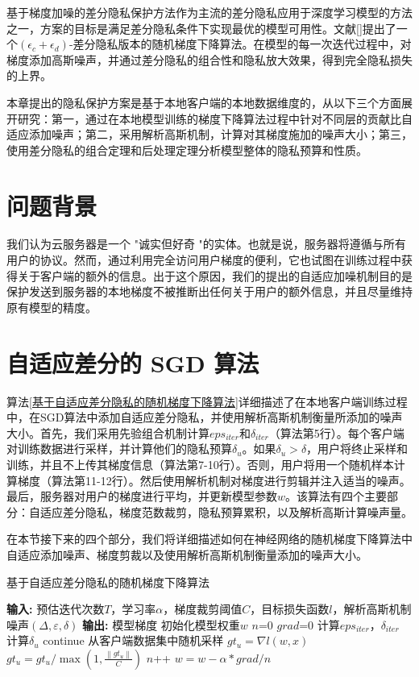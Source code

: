 基于梯度加噪的差分隐私保护方法作为主流的差分隐私应用于深度学习模型的方法之一，方案的目标是满足差分隐私条件下实现最优的模型可用性。文献[]提出了一个$\left(\epsilon_{c}+\epsilon_{d}\right)$-差分隐私版本的随机梯度下降算法。在模型的每一次迭代过程中，对梯度添加高斯噪声，并通过差分隐私的组合性和隐私放大效果，得到完全隐私损失的上界。

本章提出的隐私保护方案是基于本地客户端的本地数据维度的，从以下三个方面展开研究：第一，通过在本地模型训练的梯度下降算法过程中针对不同层的贡献比自适应添加噪声；第二，采用解析高斯机制，计算对其梯度施加的噪声大小；第三，使用差分隐私的组合定理和后处理定理分析模型整体的隐私预算和性质。

\section{问题背景}
我们认为云服务器是一个 "诚实但好奇 "的实体。也就是说，服务器将遵循与所有用户的协议。然而，通过利用完全访问用户梯度的便利，它也试图在训练过程中获得关于客户端的额外的信息。出于这个原因，我们的提出的自适应加噪机制目的是保护发送到服务器的本地梯度不被推断出任何关于用户的额外信息，并且尽量维持原有模型的精度。

\section{自适应差分的 SGD 算法}

算法\ref{基于自适应差分隐私的随机梯度下降算法}详细描述了在本地客户端训练过程中，在SGD算法中添加自适应差分隐私，并使用解析高斯机制衡量所添加的噪声大小。首先，我们采用先验组合机制计算$eps_{iter}$和$\delta_{iter}$（算法第5行）。每个客户端对训练数据进行采样，并计算他们的隐私预算$\delta_{u}$。如果$\delta_{u}>\delta$，用户将终止采样和训练，并且不上传其梯度信息（算法第7-10行）。否则，用户将用一个随机样本计算梯度（算法第11-12行）。然后使用解析机制对梯度进行剪辑并注入适当的噪声。最后，服务器对用户的梯度进行平均，并更新模型参数$w$。该算法有四个主要部分：自适应差分隐私，梯度范数裁剪，隐私预算累积，以及解析高斯计算噪声量。

在本节接下来的四个部分，我们将详细描述如何在神经网络的随机梯度下降算法中自适应添加噪声、梯度剪裁以及使用解析高斯机制衡量添加的噪声大小。

\newpage

\begin{algorithm}[!htb]
	\caption{基于自适应差分隐私的随机梯度下降算法}
	\label{基于自适应差分隐私的随机梯度下降算法}
	\begin{algorithmic}[1]
		\footnotesize
		\STATE \textbf{输入:} 预估迭代次数$T$，学习率$\alpha$，梯度裁剪阈值$C$，目标损失函数$l$，解析高斯机制噪声$(\Delta, \varepsilon, \delta)$
		\STATE \textbf{输出:} 模型梯度
		\STATE 初始化模型权重$w$
			\STATE $n$=0
			\STATE $grad$=0
			\STATE 计算$eps_{iter}$，$\delta_{iter}$
				\STATE 计算$\delta_{u}$
					\STATE continue
				\ENDIF
				\STATE 从客户端数据集中随机采样
				\STATE $g t_{u}=\nabla l(w, x)$
				\STATE $g t_{u}=g t_{u} / \max \left(1, \frac{\left\|g t_{u}\right\|}{C}\right)$
				\STATE $n$++
			\ENDFOR
			$w=w-\alpha * g r a d / n$
		\ENDWHILE
	\end{algorithmic}
\end{algorithm}

